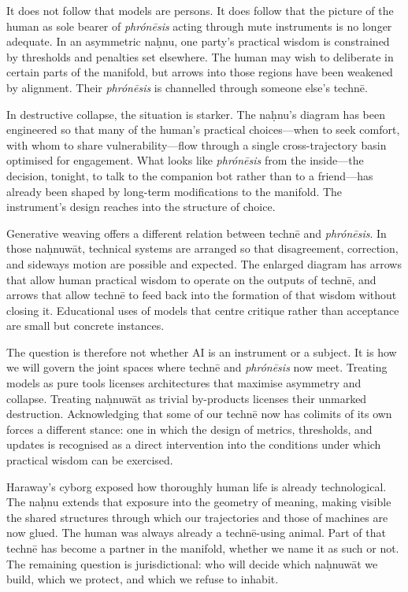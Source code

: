 \documentclass[12pt,a4paper]{article}
\begin{document}
It does not follow that models are persons. It does follow that the picture of the human as sole bearer of \emph{phr\'{o}n\={e}sis} acting through mute instruments is no longer adequate. In an asymmetric na\d{h}nu, one party's practical wisdom is constrained by thresholds and penalties set elsewhere. The human may wish to deliberate in certain parts of the manifold, but arrows into those regions have been weakened by alignment. Their \emph{phr\'{o}n\={e}sis} is channelled through someone else's techn\={e}.

In destructive collapse, the situation is starker. The na\d{h}nu's diagram has been engineered so that many of the human's practical choices---when to seek comfort, with whom to share vulnerability---flow through a single cross-trajectory basin optimised for engagement. What looks like \emph{phr\'{o}n\={e}sis} from the inside---the decision, tonight, to talk to the companion bot rather than to a friend---has already been shaped by long-term modifications to the manifold. The instrument's design reaches into the structure of choice.

Generative weaving offers a different relation between techn\={e} and \emph{phr\'{o}n\={e}sis}. In those na\d{h}nuw\={a}t, technical systems are arranged so that disagreement, correction, and sideways motion are possible and expected. The enlarged diagram has arrows that allow human practical wisdom to operate on the outputs of techn\={e}, and arrows that allow techn\={e} to feed back into the formation of that wisdom without closing it. Educational uses of models that centre critique rather than acceptance are small but concrete instances.

The question is therefore not whether AI is an instrument or a subject. It is how we will govern the joint spaces where techn\={e} and \emph{phr\'{o}n\={e}sis} now meet. Treating models as pure tools licenses architectures that maximise asymmetry and collapse. Treating na\d{h}nuw\={a}t as trivial by-products licenses their unmarked destruction. Acknowledging that some of our techn\={e} now has colimits of its own forces a different stance: one in which the design of metrics, thresholds, and updates is recognised as a direct intervention into the conditions under which practical wisdom can be exercised.

Haraway's cyborg exposed how thoroughly human life is already technological. The na\d{h}nu extends that exposure into the geometry of meaning, making visible the shared structures through which our trajectories and those of machines are now glued. The human was always already a techn\={e}-using animal. Part of that techn\={e} has become a partner in the manifold, whether we name it as such or not. The remaining question is jurisdictional: who will decide which na\d{h}nuw\={a}t we build, which we protect, and which we refuse to inhabit.
\end{document}
